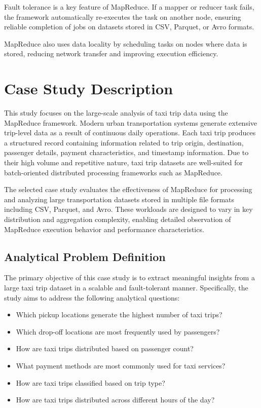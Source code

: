 \documentclass[12pt,a4paper]{report}
\begin{document}
Fault tolerance is a key feature of MapReduce. If a mapper or reducer task fails, the
framework automatically re-executes the task on another node, ensuring reliable
completion of jobs on datasets stored in CSV, Parquet, or Avro formats.

MapReduce also uses data locality by scheduling tasks on nodes where data is stored,
reducing network transfer and improving execution efficiency.
\clearpage

\section{Case Study Description}

This study focuses on the large-scale analysis of taxi trip data using the MapReduce
framework. Modern urban transportation systems generate extensive trip-level data as
a result of continuous daily operations. Each taxi trip produces a structured record
containing information related to trip origin, destination, passenger details, payment
characteristics, and timestamp information. Due to their high volume and repetitive
nature, taxi trip datasets are well-suited for batch-oriented distributed processing
frameworks such as MapReduce.

The selected case study evaluates the effectiveness of MapReduce for processing and
analyzing large transportation datasets stored in multiple file formats including CSV,
Parquet, and Avro. These workloads are designed to vary in key distribution and
aggregation complexity, enabling detailed observation of MapReduce execution behavior
and performance characteristics.


\subsection{Analytical Problem Definition}

The primary objective of this case study is to extract meaningful insights from a large
taxi trip dataset in a scalable and fault-tolerant manner. Specifically, the study aims to
address the following analytical questions:

\begin{itemize}
    \item Which pickup locations generate the highest number of taxi trips?
    \item Which drop-off locations are most frequently used by passengers?
    \item How are taxi trips distributed based on passenger count?
    \item What payment methods are most commonly used for taxi services?
    \item How are taxi trips classified based on trip type?
    \item How are taxi trips distributed across different hours of the day?
\end{itemize}
\end{document}
